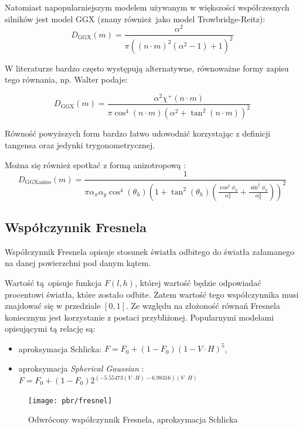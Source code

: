 \documentclass[../main.tex]{subfiles}
\begin{document}
Natomiast napopularniejszym modelem używanym w większości współczesnych silników
jest model GGX (znany również jako model Trowbridge-Reitz):
\[
  D_{\text{GGX}}(m) =
    \frac{
      \alpha^2
    }{
      \pi \left(
        \left(n \cdot m \right)^{2}
        \left(\alpha^2 - 1 \right)
        + 1
      \right)^2
    }
\]

W literaturze bardzo często występują alternatywne, równoważne formy zapisu
tego równania, np. Walter podaje: %

\[
  D_{\text{GGX}}(m) =
    \frac{\alpha^2 \chi^{+}(n \cdot m)}{
      \pi \cos^{4} (n \cdot m) \left( \alpha^2 + \tan^2 (n \cdot m) \right)^2
    }
\]

\noindent Równość powyższych form bardzo łatwo udowodnić korzystając z
definicji tangensa oraz jedynki trygonometrycznej.

Można się również spotkać z formą anizotropową \cite{pbrt}:
\[
  D_{\text{GGXaniso}}(m) =
    \frac{1}{
      \pi \alpha_x \alpha_y \cos^{4} (\theta_h) \left(
        1 + \tan^{2}(\theta_h) \left(
          \frac{\cos^{2}{\phi_h}}{\alpha_{x}^{2}} +
          \frac{\sin^{2}{\phi_h}}{\alpha_{y}^{2}}
        \right)
      \right)^{2}
    }
\]

\subsection{Współczynnik Fresnela}

Współczynnik Fresnela opisuje stosunek światła odbitego do światła załamanego
na danej powierzchni pod danym kątem.

Wartość tą opisuje funkcja $F(l,h)$, której wartość będzie odpowiadać
procentowi światła, które zostało odbite. Zatem wartość tego współczynnika musi
znajdować się w przedziale $[0,1]$. Ze względu na złożoność równań Fresnela
koniecznym jest korzystanie z postaci przybliżonej. Popularnymi modelami
opisującymi tą relację są:

\begin{itemize}
\item aproksymacja Schlicka: $F = F_0 + (1 - F_0)(1-V \cdot H)^5$,
\item aproksymacja \textit{Spherical Gaussian} \cite{SphericalGaussianLegarde}:
  $ F = F_0 +(1−F_0) 2^{
    \left(−5.55473\left(V \cdot H\right)−6.98316\right) (V \cdot H)
  } $
\end{itemize}

\begin{figure}[ht]
  \centering
  \texttt{[image: pbr/fresnel]}
  \caption{Odwrócony współczynnik Fresnela, aproksymacja Schlicka}
\end{figure}
\end{document}
